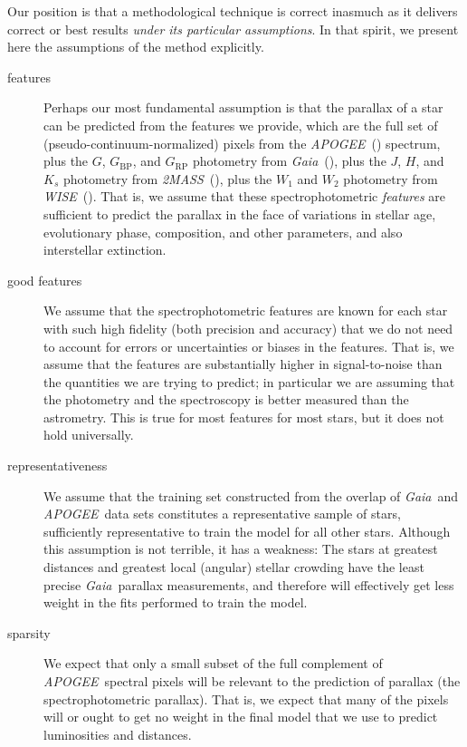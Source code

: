 \documentclass[modern]{aastex62}
\newcommand{\acronym}[1]{{\small{#1}}}
\newcommand{\project}[1]{\textsl{#1}}
\newcommand{\apogee}{\project{\acronym{APOGEE}}}
\newcommand{\gaia}{\project{Gaia}}
\newcommand{\wise}{\project{\acronym{WISE}}}
\newcommand{\zmass}{\project{\acronym{2MASS}}}
\newcommand{\BP}{{G_\mathrm{BP}}}
\newcommand{\RP}{{G_\mathrm{RP}}}
\begin{document}
Our position is that a methodological technique is correct inasmuch as
it delivers correct or best results \emph{under its particular assumptions}.
In that spirit, we present here the assumptions of the method
explicitly.
\begin{description}
\item[features] Perhaps our most fundamental assumption is that the parallax
of a star can be predicted from the features we provide, which are
the full set of (pseudo-continuum-normalized) pixels from the \apogee\ (\citealt{apogee}) spectrum,
plus the $G$, $\BP$, and $\RP$ photometry from \gaia\ (\citealt{gaia}),
plus the $J$, $H$, and $K_s$ photometry from \zmass\ (\citealt{zmass}),
plus the $W_1$ and $W_2$ photometry from \wise\ (\citealt{wise}).
That is, we assume that these spectrophotometric \emph{features} are sufficient
to predict the parallax in the face of variations in stellar
age, evolutionary phase, composition, and other parameters, and also interstellar
extinction.

\item[good features] We assume that the spectrophotometric features are known for
each star with such high fidelity (both precision and accuracy) that we do not
need to account for errors or uncertainties or biases in the features.
That is, we assume that the features are substantially higher in signal-to-noise than the
quantities we are trying to predict; in particular we are assuming that the photometry
and the spectroscopy is better measured than the astrometry.
This is true for most features for most stars, but it does not hold universally.

\item[representativeness] We assume that the training set constructed from the overlap
of \gaia\ and \apogee\ data sets constitutes a representative sample of stars,
sufficiently representative to train the model for all other stars.
Although this assumption is not terrible, it has a weakness:
The stars at greatest distances and greatest local (angular) stellar crowding have
the least precise \gaia\ parallax measurements, and therefore will effectively get
less weight in the fits performed to train the model.

\item[sparsity] We expect that only a small subset of the full complement of
\apogee\ spectral pixels will be relevant to the prediction of parallax
(the spectrophotometric parallax).
That is, we expect that many of the pixels will or ought to get no weight in the
final model that we use to predict luminosities and distances.


\end{description}
\end{document}
